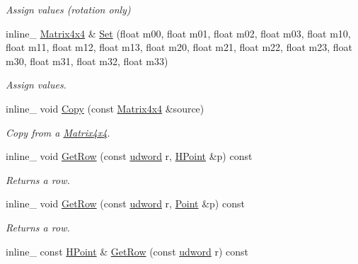\begin{DoxyCompactItemize}
\begin{DoxyCompactList}\small\item\em Assign values (rotation only) \end{DoxyCompactList}\item 
\hypertarget{class_matrix4x4_a13789f3a27674890fc8ca5522d899fe3}{inline\+\_\+ \hyperlink{class_matrix4x4}{Matrix4x4} \& \hyperlink{class_matrix4x4_a13789f3a27674890fc8ca5522d899fe3}{Set} (float m00, float m01, float m02, float m03, float m10, float m11, float m12, float m13, float m20, float m21, float m22, float m23, float m30, float m31, float m32, float m33)}\label{class_matrix4x4_a13789f3a27674890fc8ca5522d899fe3}

\begin{DoxyCompactList}\small\item\em Assign values. \end{DoxyCompactList}\item 
\hypertarget{class_matrix4x4_aea9e8b9bde1c68f00f9e5629d487d17f}{inline\+\_\+ void \hyperlink{class_matrix4x4_aea9e8b9bde1c68f00f9e5629d487d17f}{Copy} (const \hyperlink{class_matrix4x4}{Matrix4x4} \&source)}\label{class_matrix4x4_aea9e8b9bde1c68f00f9e5629d487d17f}

\begin{DoxyCompactList}\small\item\em Copy from a \hyperlink{class_matrix4x4}{Matrix4x4}. \end{DoxyCompactList}\item 
\hypertarget{class_matrix4x4_a341d15f2f21a815d499498fb2dfc05d4}{inline\+\_\+ void \hyperlink{class_matrix4x4_a341d15f2f21a815d499498fb2dfc05d4}{Get\+Row} (const \hyperlink{_ice_types_8h_a44c6f1920ba5551225fb534f9d1a1733}{udword} r, \hyperlink{class_h_point}{H\+Point} \&p) const }\label{class_matrix4x4_a341d15f2f21a815d499498fb2dfc05d4}

\begin{DoxyCompactList}\small\item\em Returns a row. \end{DoxyCompactList}\item 
\hypertarget{class_matrix4x4_a25d5b7ea8d63a5fde36eb2854d0cf1cb}{inline\+\_\+ void \hyperlink{class_matrix4x4_a25d5b7ea8d63a5fde36eb2854d0cf1cb}{Get\+Row} (const \hyperlink{_ice_types_8h_a44c6f1920ba5551225fb534f9d1a1733}{udword} r, \hyperlink{class_point}{Point} \&p) const }\label{class_matrix4x4_a25d5b7ea8d63a5fde36eb2854d0cf1cb}

\begin{DoxyCompactList}\small\item\em Returns a row. \end{DoxyCompactList}\item 
\hypertarget{class_matrix4x4_a37e34d7c04a4353678634846326ba275}{inline\+\_\+ const \hyperlink{class_h_point}{H\+Point} \& \hyperlink{class_matrix4x4_a37e34d7c04a4353678634846326ba275}{Get\+Row} (const \hyperlink{_ice_types_8h_a44c6f1920ba5551225fb534f9d1a1733}{udword} r) const }\label{class_matrix4x4_a37e34d7c04a4353678634846326ba275}


\end{DoxyCompactItemize}
